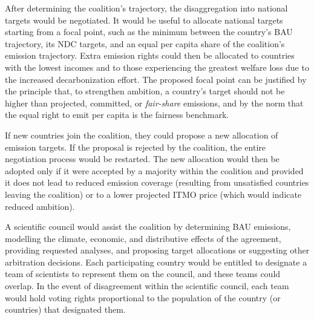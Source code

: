 \documentclass[12pt,english]{article}
\begin{document}
After determining the coalition's trajectory, the disaggregation into national targets would be negotiated. It would be useful to allocate national targets starting from a focal point, such as  %
the minimum between the country's BAU trajectory, its NDC targets, and an equal per capita share of the coalition's emission trajectory. Extra emission rights could then be allocated to countries with the lowest incomes and to those experiencing the greatest welfare loss due to the increased decarbonization effort. %
The proposed focal point can be justified by the principle that, to strengthen ambition, a country's target should not be higher than projected, committed, or \textit{fair-share} emissions, and by the norm that the equal right to emit per capita is the fairness benchmark. %

If new countries join the coalition, they could propose a new allocation of emission targets. If the proposal is rejected by the coalition, the entire negotiation process would be restarted. The new allocation would then be adopted only if it were accepted by a majority within the coalition and provided it does not lead to reduced emission coverage (resulting from unsatisfied countries leaving the coalition) or to a lower projected ITMO price (which would indicate reduced ambition). 

A scientific council would assist the coalition by determining BAU emissions, modelling the climate, economic, and distributive effects of the agreement, providing requested analyses, and proposing target allocations or suggesting other arbitration decisions. Each participating country would be entitled to designate a team of scientists to represent them on the council, and these teams could %
overlap. %
In the event of disagreement within the scientific council, each team would hold voting rights proportional to the population of the country (or countries) that designated them.
\end{document}
